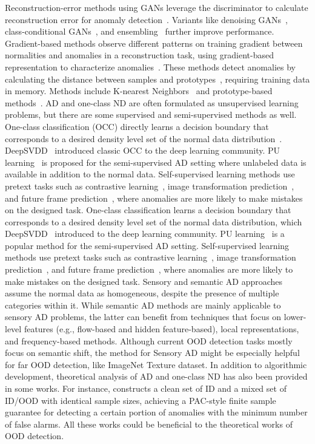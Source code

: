 Reconstruction-error methods using GANs leverage the discriminator to calculate reconstruction error for anomaly detection~. Variants like denoising GANs~, class-conditional GANs~, and ensembling~ further improve performance.
Gradient-based methods observe different patterns on training gradient between normalities and anomalies in a reconstruction task, using gradient-based representation to characterize anomalies~.
\smallskip
{}
\label{sec:ad_distance}
These methods detect anomalies by calculating the distance between samples and prototypes~, requiring training data in memory. Methods include K-nearest Neighbors~ and prototype-based methods~.
\smallskip
{}
\label{sec:ad_classification}
AD and one-class ND are often formulated as unsupervised learning problems, but there are some supervised and semi-supervised methods as well. One-class classification (OCC) directly learns a decision boundary that corresponds to a desired density level set of the normal data distribution~. DeepSVDD~ introduced classic OCC to the deep learning community. PU learning~ is proposed for the semi-supervised AD setting where unlabeled data is available in addition to the normal data. Self-supervised learning methods use pretext tasks such as contrastive learning~, image transformation prediction~, and future frame prediction~, where anomalies are more likely to make mistakes on the designed task.
One-class classification learns a decision boundary that corresponds to a desired density level set of the normal data distribution, which DeepSVDD~ introduced to the deep learning community. PU learning~ is a popular method for the semi-supervised AD setting. Self-supervised learning methods use pretext tasks such as contrastive learning~, image transformation prediction~, and future frame prediction~, where anomalies are more likely to make mistakes on the designed task.
\smallskip
{}
Sensory and semantic AD approaches assume the normal data as homogeneous, despite the presence of multiple categories within it. While semantic AD methods are mainly applicable to sensory AD problems, the latter can benefit from techniques that focus on lower-level features (e.g., flow-based and hidden feature-based), local representations, and frequency-based methods. Although current OOD detection tasks mostly focus on semantic shift, the method for Sensory AD might be especially helpful for far OOD detection, like ImageNet \vs Texture dataset.
\smallskip
{}
In addition to algorithmic development, theoretical analysis of AD and one-class ND has also been provided in some works. For instance,  constructs a clean set of ID and a mixed set of ID/OOD with identical sample sizes, achieving a PAC-style finite sample guarantee for detecting a certain portion of anomalies with the minimum number of false alarms. All these works could be beneficial to the theoretical works of OOD detection.

